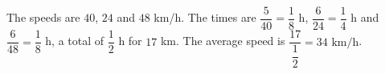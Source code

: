 The speeds are $40$, $24$ and $48$ km/h. The times are $\dfrac{5}{40}=\dfrac{1}{8}$ h, $\dfrac{6}{24}=\dfrac{1}{4}$ h and $\dfrac{6}{48}=\dfrac{1}{8}$ h, a total of $\dfrac{1}{2}$ h for $17$ km. The average speed is $\dfrac{17}{\dfrac{1}{2}}=\boxed{34\text{ km/h}}$.
